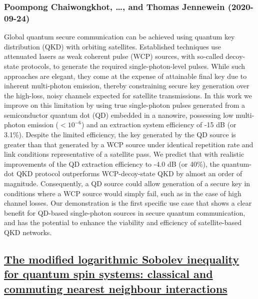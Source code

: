 \subsubsection*{Poompong Chaiwongkhot, \dots, and Thomas Jennewein (2020-09-24)}
Global quantum secure communication can be achieved using quantum key
distribution (QKD) with orbiting satellites. Established techniques use
attenuated lasers as weak coherent pulse (WCP) sources, with so-called
decoy-state protocols, to generate the required single-photon-level pulses.
While such approaches are elegant, they come at the expense of attainable final
key due to inherent multi-photon emission, thereby constraining secure key
generation over the high-loss, noisy channels expected for satellite
transmissions. In this work we improve on this limitation by using true
single-photon pulses generated from a semiconductor quantum dot (QD) embedded
in a nanowire, possessing low multi-photon emission ($<10^{-6}$) and an
extraction system efficiency of -15 dB (or 3.1\%). Despite the limited
efficiency, the key generated by the QD source is greater than that generated
by a WCP source under identical repetition rate and link conditions
representative of a satellite pass. We predict that with realistic improvements
of the QD extraction efficiency to -4.0 dB (or 40\%), the quantum-dot QKD
protocol outperforms WCP-decoy-state QKD by almost an order of magnitude.
Consequently, a QD source could allow generation of a secure key in conditions
where a WCP source would simply fail, such as in the case of high channel
losses. Our demonstration is the first specific use case that shows a clear
benefit for QD-based single-photon sources in secure quantum communication, and
has the potential to enhance the viability and efficiency of satellite-based
QKD networks.

\subsection*{\href{http://arxiv.org/abs/2009.11817v1}{The modified logarithmic Sobolev inequality for quantum spin systems:  classical and commuting nearest neighbour interactions}}
